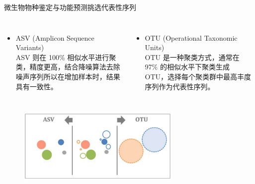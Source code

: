 \documentclass{beamer}
\begin{document}
	\begin{frame}{微生物物种鉴定与功能预测}{挑选代表性序列}
		\begin{columns}
			\begin{itemize}
				\item ASV {\tiny (Amplicon Sequence Variants)} \\ \qquad ASV 则在 100\% 相似水平进行聚类，精度更高，结合降噪算法去除噪声序列所以在增加样本时，结果具有一致性。
			\end{itemize}
			
			\begin{itemize}
				\item OTU {\tiny (Operational Taxonomic Units)} \\ \qquad OTU 是一种聚类方式，通常在 97\% 的相似水平下聚类生成 OTU，选择每个聚类群中最高丰度序列作为代表性序列。
			\end{itemize}
		\end{columns}

		\begin{figure}
			\centering
			\includegraphics[width=0.7\textwidth]{img/OTUvsASV.png}
		\end{figure}
	\end{frame}
\end{document}
